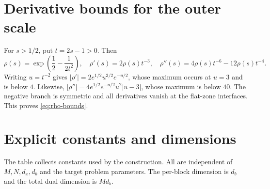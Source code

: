 \documentclass[11pt,a4paper]{article}
\theoremstyle{definition}
\theoremstyle{remark}
\numberwithin{equation}{section}
\begin{document}
\clearpage
\appendix
\section{Derivative bounds for the outer scale}
\label{app:rho}

For $s>1/2$, put $t=2s-1>0$.  Then
\[
 \rho(s)=\exp\!\left(\frac12-\frac1{2t^2}\right),
 \quad
 \rho'(s)=2\rho(s)t^{-3},
 \quad
 \rho''(s)=4\rho(s)t^{-6}-12\rho(s)t^{-4}.
\]
Writing $u=t^{-2}$ gives
$|\rho'|=2e^{1/2}u^{3/2}e^{-u/2}$, whose maximum occurs at $u=3$ and is below $4$.  Likewise,
$|\rho''|=4e^{1/2}e^{-u/2}u^2|u-3|$, whose maximum is below $40$.  The negative branch is symmetric and all derivatives vanish at the flat-zone interfaces.  This proves \eqref{eq:rho-bounds}.

\section{Explicit constants and dimensions}
\label{app:constants}

The table collects constants used by the construction. All are
independent of $M,N,d_x,d_b$ and the target problem parameters.
The per-block dimension is $d_b$ and the total dual dimension is $Md_b$.
\end{document}
